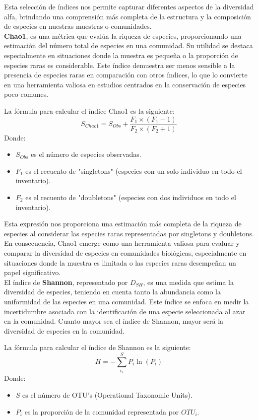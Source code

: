 Esta selección de índices nos permite capturar diferentes aspectos de la diversidad alfa, brindando una comprensión más completa de la estructura y la composición de especies en nuestras muestras o comunidades.\\

\textbf{Chao1}, es una métrica que evalúa la riqueza de especies, proporcionando una estimación del número total de especies en una comunidad. Su utilidad se destaca especialmente en situaciones donde la muestra es pequeña o la proporción de especies raras es considerable. Este índice demuestra ser menos sensible a la presencia de especies raras en comparación con otros índices, lo que lo convierte en una herramienta valiosa en estudios centrados en la conservación de especies poco comunes.

La fórmula para calcular el índice Chao1 es la siguiente:
$$S_{Chao1} = S_{Obs} + \frac{F_1×(F_1-1)}{F_2×(F_2+1)}$$
Donde:
\begin{itemize}
    \item $S_{Obs}$ es el número de especies observadas.
    \item $F_1$ es el recuento de "singletons" (especies con un solo individuo en todo el inventario).
    \item $F_2$ es el recuento de "doubletons" (especies con dos individuos en todo el inventario).
\end{itemize}

Esta expresión nos proporciona una estimación más completa de la riqueza de especies al considerar las especies raras representadas por singletons y doubletons. En consecuencia, Chao1 emerge como una herramienta valiosa para evaluar y comparar la diversidad de especies en comunidades biológicas, especialmente en situaciones donde la muestra es limitada o las especies raras desempeñan un papel significativo.\\

El índice de \textbf{Shannon}, representado por $D_{SH}$, es una medida que estima la diversidad de especies, teniendo en cuenta tanto la abundancia como la uniformidad de las especies en una comunidad. Este índice se enfoca en medir la incertidumbre asociada con la identificación de una especie seleccionada al azar en la comunidad. Cuanto mayor sea el índice de Shannon, mayor será la diversidad de especies en la comunidad.

La fórmula para calcular el índice de Shannon es la siguiente:
$$H=-\sum_{i_1}^{S}{P_{i}\ln(P_{i})}$$
Donde:
\begin{itemize}
    \item $S$ es el número de OTU's (Operational Taxonomic Units).
    \item $P_i$ es la proporción de la comunidad representada por $OTU_i$.
\end{itemize}

